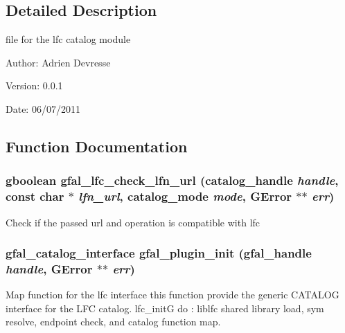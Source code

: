 \subsection{Detailed Description}
file for the lfc catalog module 

\begin{Desc}
\item[Author:]Adrien Devresse \end{Desc}
\begin{Desc}
\item[Version:]0.0.1 \end{Desc}
\begin{Desc}
\item[Date:]06/07/2011 \end{Desc}


\subsection{Function Documentation}
\subsubsection{\setlength{\rightskip}{0pt plus 5cm}gboolean gfal\_\-lfc\_\-check\_\-lfn\_\-url (catalog\_\-handle {\em handle}, const char $\ast$ {\em lfn\_\-url}, catalog\_\-mode {\em mode}, GError $\ast$$\ast$ {\em err})}\label{gfal__common__lfc_8c_8baa624b528deb15ff4ee61fa9948ac8}


Check if the passed url and operation is compatible with lfc 
\subsubsection{\setlength{\rightskip}{0pt plus 5cm}gfal\_\-catalog\_\-interface gfal\_\-plugin\_\-init (gfal\_\-handle {\em handle}, GError $\ast$$\ast$ {\em err})}\label{gfal__common__lfc_8c_5c9edde4d67d96432a319d940a4799f1}


Map function for the lfc interface this function provide the generic CATALOG interface for the LFC catalog. lfc\_\-init\-G do : liblfc shared library load, sym resolve, endpoint check, and catalog function map. 
